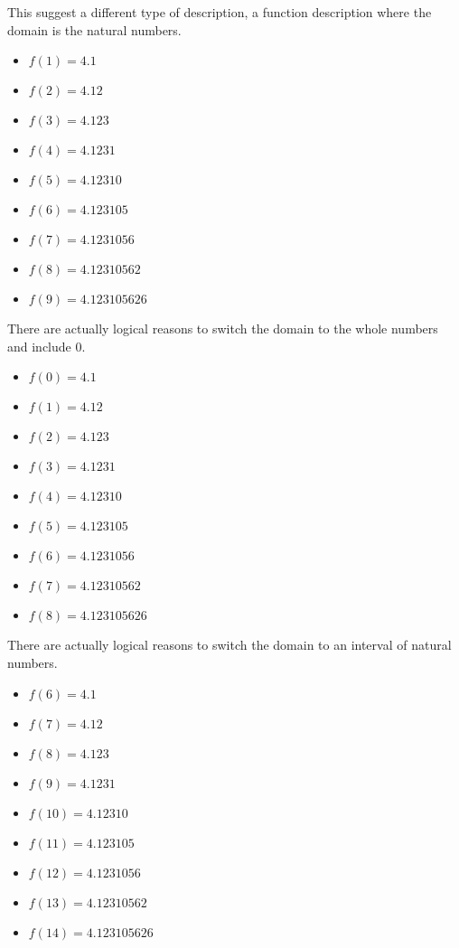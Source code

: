\documentclass{ximera}
\begin{document}
This suggest a different type of description, a function description where the domain is the natural numbers.



\begin{itemize}
\item $f(1) = 4.1$
\item $f(2) = 4.12$
\item $f(3) = 4.123$
\item $f(4) = 4.1231$
\item $f(5) = 4.12310$
\item $f(6) = 4.123105$
\item $f(7) = 4.1231056$
\item $f(8) = 4.12310562$
\item $f(9) = 4.123105626$
\end{itemize}



There are actually logical reasons to switch the domain to the whole numbers and include $0$.





\begin{itemize}
\item $f(0) = 4.1$
\item $f(1) = 4.12$
\item $f(2) = 4.123$
\item $f(3) = 4.1231$
\item $f(4) = 4.12310$
\item $f(5) = 4.123105$
\item $f(6) = 4.1231056$
\item $f(7) = 4.12310562$
\item $f(8) = 4.123105626$
\end{itemize}




There are actually logical reasons to switch the domain to an interval of natural numbers.





\begin{itemize}
\item $f(6) = 4.1$
\item $f(7) = 4.12$
\item $f(8) = 4.123$
\item $f(9) = 4.1231$
\item $f(10) = 4.12310$
\item $f(11) = 4.123105$
\item $f(12) = 4.1231056$
\item $f(13) = 4.12310562$
\item $f(14) = 4.123105626$
\end{itemize}
\end{document}
